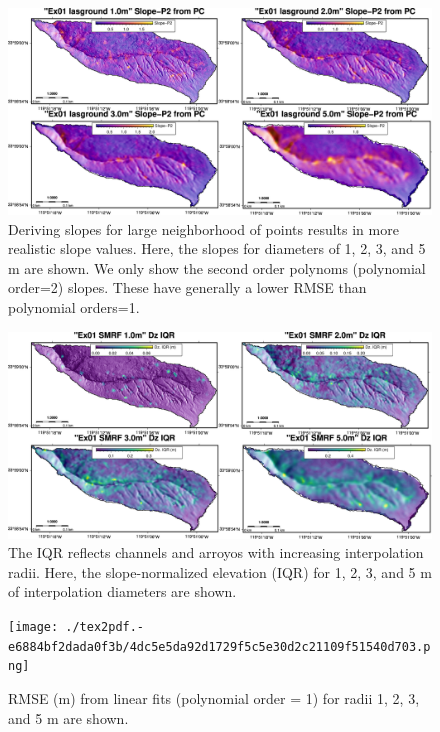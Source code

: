 \documentclass[a4paperpaper,,tablecaptionabove]{scrartcl}
\begin{document}
\begin{figure}
\centering
\includegraphics[width=\textwidth,height=0.9\textheight]{./tex2pdf.-e6884bf2dada0f3b/e21d6ee294348cce3bd17e5e3e4943b918eac98f.png}
\caption{Deriving slopes for large neighborhood of points results in
more realistic slope values. Here, the slopes for diameters of 1, 2, 3,
and 5 m are shown. We only show the second order polynoms (polynomial
order=2) slopes. These have generally a lower RMSE than polynomial
orders=1. \label{Fig:lasground_slopeP2_1_2_3_5m}}
\end{figure}

\begin{figure}
\centering
\includegraphics[width=\textwidth,height=0.9\textheight]{./tex2pdf.-e6884bf2dada0f3b/60a2504196ffb0c6844e21ac20c6cb5f3aaa7710.png}
\caption{The IQR reflects channels and arroyos with increasing
interpolation radii. Here, the slope-normalized elevation (IQR) for 1,
2, 3, and 5 m of interpolation diameters are shown.
\label{Fig:dz_IQR_1_2_3_5m}}
\end{figure}

\begin{figure}
\centering
\texttt{[image: ./tex2pdf.-e6884bf2dada0f3b/4dc5e5da92d1729f5c5e30d2c21109f51540d703.png]}
\caption{RMSE (m) from linear fits (polynomial order = 1) for radii 1,
2, 3, and 5 m are shown. \label{Fig:lasground_RMSE_P1_1_2_3_5m}}
\end{figure}
\end{document}
